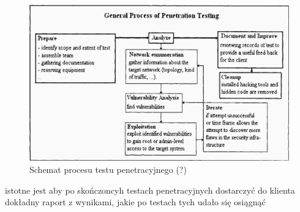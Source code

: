 



\begin{figure}
  \caption{Schemat procesu testu penetracyjnego (?)}
    \includegraphics{others/pentest_process}
\end{figure}


istotne jest aby po skończoncyh testach penetracyjnych dostarczyć do klienta dokładny raport z wynikami, jakie po testach tych udało się osiągnąć



